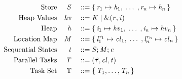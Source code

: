 \begin{displaymath}
  \begin{aligned}
    \textup{Store} && \mathit{S} && \; ::= \; & \{ \, \mathit{r}_1 \mapsto \mathit{h}_1 , \; \ldots \; , \mathit{r}_{n} \mapsto \mathit{h}_{n} \,\} \\
    \textup{Heap Values} && \mathit{hv} && \; ::= \; & \mathit{K} \; | \; \text{\&}(\mathit{r},\mathit{i}) \\
    \textup{Heap} && \mathit{h} && \; ::= \; & \{ \, \mathit{i}_1 \mapsto \mathit{hv}_1 , \; \ldots \; , \mathit{i}_{n} \mapsto \mathit{hv}_{n} \,\}\\
    \textup{Location Map} && \mathit{M} && \; ::= \; & \{ \, {\mathit{l}}^{\mathit{r}_1}_1 \mapsto \mathit{cl}{}_1 , \; \ldots \; , {\mathit{l}}^{\mathit{r}_n}_n \mapsto \mathit{cl}{}_n \,\} \\
    \textup{Sequential States} && \mathit{t} && \; ::= \; & \mathit{S} ; \mathit{M} ; \mathit{e} \\
    \textup{Parallel Tasks} && \mathit{T} && \; ::= \; & (\mathit{\hat{\tau}}, \mathit{cl}{}, \mathit{t}) \\
    \textup{Task Set} && \mathbb{T} && \; ::= \; & \{ \,  \mathit{T}_1, \ldots, \mathit{T}_n  \,\}
  \end{aligned}
\end{displaymath}
